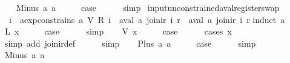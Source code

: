 \begin{isabellebody}
\ \ \isamarkupfalse%
\ {\isacharparenleft}Minus\ a{}\ a{}{\isacharparenright}\isanewline
\ \ \isamarkupfalse%
\ \isamarkupfalse%
\ {\isacharquery}case\isanewline
\ \ \ \ \isamarkupfalse%
\ simp\isanewline
{}\isamarkupfalse%
%
\endisatagproof
{\isafoldproof}%
%
\isadelimproof
\isanewline
%
\endisadelimproof
\isanewline
{}\isamarkupfalse%
\ input{\isacharunderscore}unconstrained{\isacharunderscore}aval{\isacharunderscore}register{\isacharunderscore}swap{\isacharcolon}\isanewline
\ \ {\isachardoublequoteopen}{\isasymforall}i{\isachardot}\ {\isasymnot}\ aexp{\isacharunderscore}constrains\ a\ {\isacharparenleft}V\ {\isacharparenleft}R\ i{\isacharparenright}{\isacharparenright}\ {\isasymLongrightarrow}\ aval\ a\ {\isacharparenleft}join{\isacharunderscore}ir\ i\ r{\isacharparenright}\ {\isacharequal}\ aval\ a\ {\isacharparenleft}join{\isacharunderscore}ir\ i\ r{\isacharprime}{\isacharparenright}{\isachardoublequoteclose}\isanewline
%
\isadelimproof
%
\endisadelimproof
%
\isatagproof
{}\isamarkupfalse%
{\isacharparenleft}induct\ a{\isacharparenright}\isanewline
{}\isamarkupfalse%
\ {\isacharparenleft}L\ x{\isacharparenright}\isanewline
\ \ \isamarkupfalse%
\ \isamarkupfalse%
\ {\isacharquery}case\isanewline
\ \ \ \ \isamarkupfalse%
\ simp\isanewline
{}\isamarkupfalse%
\isanewline
\ \ \isamarkupfalse%
\ {\isacharparenleft}V\ x{\isacharparenright}\isanewline
\ \ \isamarkupfalse%
\ \isamarkupfalse%
\ {\isacharquery}case\isanewline
\ \ \ \ \isamarkupfalse%
\ {\isacharparenleft}cases\ x{\isacharparenright}\isanewline
\ \ \ \ \ \isamarkupfalse%
\ {\isacharparenleft}simp\ add{\isacharcolon}\ join{\isacharunderscore}ir{\isacharunderscore}def{\isacharparenright}\isanewline
\ \ \ \ \isamarkupfalse%
\ simp\isanewline
{}\isamarkupfalse%
\isanewline
\ \ \isamarkupfalse%
\ {\isacharparenleft}Plus\ a{}\ a{}{\isacharparenright}\isanewline
\ \ \isamarkupfalse%
\ \isamarkupfalse%
\ {\isacharquery}case\isanewline
\ \ \ \ \isamarkupfalse%
\ simp\isanewline
{}\isamarkupfalse%
\isanewline
\ \ \isamarkupfalse%
\ {\isacharparenleft}Minus\ a{}\ a{}{\isacharparenright}\isanewline
\ \ \isamarkupfalse%
\ \isamarkupfalse%

\end{isabellebody}
